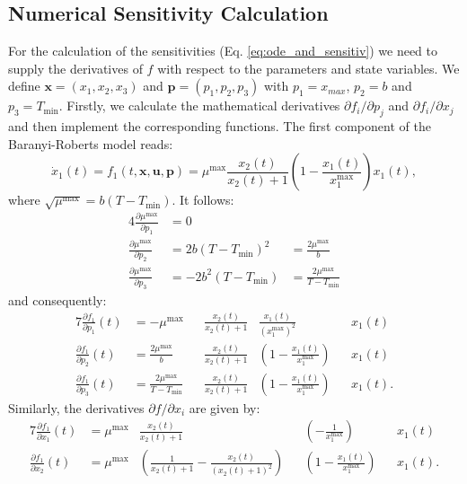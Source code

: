 \documentclass[10pt,A4paper]{article}
\newcommand{\mbx}{\mathbf{x}}
\newcommand{\mbu}{\mathbf{u}}
\newcommand{\mbp}{\mathbf{p}}
\begin{document}
\subsection*{Numerical Sensitivity Calculation}
For the calculation of the sensitivities (Eq. \ref{eq:ode_and_sensitiv}) we need to supply the derivatives of $f$ with respect to the parameters and state variables. 
We define $\mbx=(x_1,x_2,x_3)$ and $\mbp=(p_1,p_2,p_3)$ with $p_1=x_{max}$, $p_2=b$ and $p_3=T_\text{min}$. 
Firstly, we calculate the mathematical derivatives $\partial f_i/\partial p_j$ and $\partial f_i/\partial x_j$ and then implement the corresponding functions. 
The first component of the Baranyi-Roberts model reads:
\begin{equation}
\label{eq:rob_bar_model}
    \dot x_1(t) = f_1(t, \mbx, \mbu, \mbp) = \mu^\text{max} \frac{x_2(t)}{x_2(t) + 1} \left(1 - \frac{x_1(t)}{x_1^\text{max}}\right) x_1(t),
\end{equation}
where $\sqrt{\mu^\text{max}}=b(T-T_\text{min})$. It follows:
\begin{alignat}{4}
    \frac{\partial\mu^\text{max}}{\partial p_1} &= 0\\
    \frac{\partial\mu^\text{max}}{\partial p_2} &= 2b(T-T_\text{min})^2 &= \frac{2\mu^\text{max}}{b}\\
    \frac{\partial\mu^\text{max}}{\partial p_3} &= -2b^2(T-T_\text{min}) &= \frac{2\mu^\text{max}}{T-T_\text{min}}
\end{alignat}
and consequently:
\begin{alignat}{7}
    \frac{\partial f_1}{\partial p_1}(t) &= - \mu^\text{max} &&\frac{x_2(t)}{x_2(t) + 1} &\frac{x_1(t)}{\left(x_1^\text{max}\right)^2} &&x_1(t)\\
    \frac{\partial f_1}{\partial p_2}(t) &= \frac{2\mu^\text{max}}{b} &&\frac{x_2(t)}{x_2(t) + 1} &\left(1 - \frac{x_1(t)}{x_1^\text{max}}\right) &&x_1(t)\\
    \frac{\partial f_1}{\partial p_3}(t) &= \frac{2\mu^\text{max}}{T-T_\text{min}} &&\frac{x_2(t)}{x_2(t) + 1} &\left(1 - \frac{x_1(t)}{x_1^\text{max}}\right) &&x_1(t).
\end{alignat}
Similarly, the derivatives $\partial f/\partial x_i$ are given by:
\begin{alignat}{7}
    \frac{\partial f_1}{\partial x_1}(t) &= \mu^\text{max} &\frac{x_2(t)}{x_2(t) + 1} && \left(-\frac{1}{x_1^\text{max}}\right) &&x_1(t)\\
    \frac{\partial f_1}{\partial x_2}(t) &= \mu^\text{max} &\left(\frac{1}{x_2(t) + 1} - \frac{x_2(t)}{(x_2(t) + 1)^2}\right) && \left(1 - \frac{x_1(t)}{x_1^\text{max}}\right) &&x_1(t).
\end{alignat}
\end{document}
